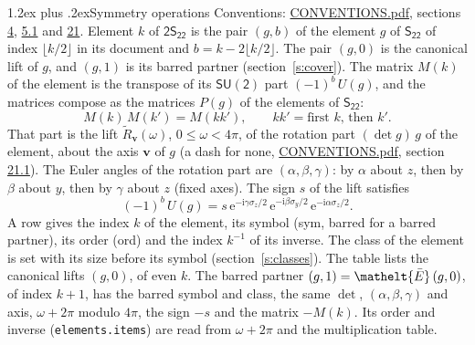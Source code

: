\documentclass[10pt,a4paper]{article}
\makeatletter
\renewcommand\section{\@startsection{section}{1}{\z@}{-3ex plus -1ex minus -.2ex}%
  {1.2ex plus .2ex}{\normalfont\large\sffamily\bfseries\color{parttitle}}}
\numberwithin{equation}{section}
\newcommand{\eltfont}[1]{{\let\sigma\eltsigma\mathelt{#1}}}
\newcommand{\grp}[1]{\mathsf{#1}}
\newcommand{\elt}[1]{\eltfont{#1}}
\newcommand{\vv}{\mathbf{v}}
\newcommand{\iunit}{\mathrm{i}}
\newcommand{\expe}{\mathrm{e}}
\newcommand{\barred}[1]{\bar{#1}}
\newcommand{\lift}[1]{\tilde{#1}}
\newcommand{\pauli}[1]{\sigma_{#1}}
\makeatother
\begin{document}
\section{Symmetry operations}\label{s:elements}
Conventions: \href{../../CONVENTIONS.pdf}{CONVENTIONS.pdf}, sections \href{../../../rotation/CONVENTIONS.pdf\#conv.4}{4}, \href{../../../rotation/CONVENTIONS.pdf\#conv.5.1}{5.1} and \href{../../CONVENTIONS.pdf\#conv.21}{21}.
\leavevmode\label{n:index.element}\label{n:element.g}Element $k$ of $\grp{2S_{22}}$ is the pair $(g, b)$ of the element $g$ of \href{../../../rotation/data/pdf/S22.pdf}{$\grp{S_{22}}$} of index $\lfloor k/2\rfloor$ in its document and $b = k - 2\lfloor k/2\rfloor$. The pair $(g, 0)$ is the canonical lift of $g$, and $(g, 1)$ is its barred partner (section~\ref{s:cover}). \label{n:matrix.element.pin}\label{n:matrix.element}The matrix $M(k)$ of the element is the transpose of its $\grp{SU(2)}$ part $(-1)^{b}\,U(g)$, and the matrices compose as the matrices $P(g)$ of the elements of $\grp{S_{22}}$:
\begin{equation}\label{e:mprod}M(k)\,M(k') = M(kk'),\qquad kk' = \text{first } k\text{, then } k'.\end{equation}
\leavevmode\label{n:angle.omega}\label{n:vector.axis}\label{n:vector.pole}That part is the lift $\lift{R}_{\vv}(\omega)$, $0 \le \omega < 4\pi$, of the rotation part $(\det g)\,g$ of the element, about the axis $\vv$ of $g$ (a dash for none, \href{../../CONVENTIONS.pdf}{CONVENTIONS.pdf}, section \href{../../CONVENTIONS.pdf\#conv.21.1}{21.1}). \label{n:angle.euler.alpha}\label{n:angle.euler.beta}\label{n:angle.euler.gamma}\label{n:vector.coordinates}The Euler angles of the rotation part are $(\alpha,\beta,\gamma)$: by $\alpha$ about $z$, then by $\beta$ about $y$, then by $\gamma$ about $z$ (fixed axes). \label{n:local.euler.sign}The sign $s$ of the lift satisfies
\begin{equation}\label{e:euler}(-1)^{b}\,U(g) = s\,\expe^{-\iunit\gamma\pauli{z}/2}\,\expe^{-\iunit\beta\pauli{y}/2}\,\expe^{-\iunit\alpha\pauli{z}/2}.\end{equation}
\leavevmode\label{n:index.element.inverse}\label{n:head.sym}\label{n:head.ord}A row gives the index $k$ of the element, its symbol (sym, barred for a barred partner), its order (ord) and the index $k^{-1}$ of its inverse. \label{n:head.class}The class of the element is set with its size before its symbol (section~\ref{s:classes}).
The table lists the canonical lifts $(g, 0)$, of even $k$. The barred partner $(g, 1) = \elt{\barred{E}}\,(g, 0)$, of index $k + 1$, has the barred symbol and class, the same $\det$, $(\alpha,\beta,\gamma)$ and axis, $\omega + 2\pi$ modulo $4\pi$, the sign $-s$ and the matrix $-M(k)$. Its order and inverse (\texttt{elements.items}) are read from $\omega + 2\pi$ and the multiplication table.
\end{document}
